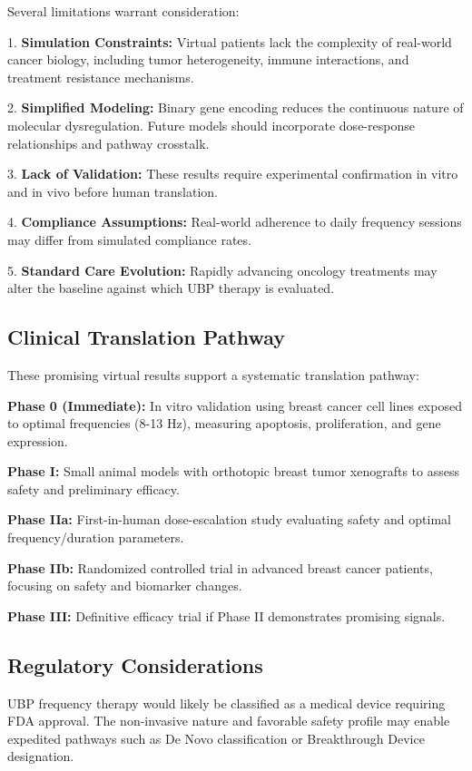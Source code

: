\documentclass[12pt,a4paper]{article}
\begin{document}
Several limitations warrant consideration:

1. \textbf{Simulation Constraints:} Virtual patients lack the complexity of real-world cancer biology, including tumor heterogeneity, immune interactions, and treatment resistance mechanisms.

2. \textbf{Simplified Modeling:} Binary gene encoding reduces the continuous nature of molecular dysregulation. Future models should incorporate dose-response relationships and pathway crosstalk.

3. \textbf{Lack of Validation:} These results require experimental confirmation in vitro and in vivo before human translation.

4. \textbf{Compliance Assumptions:} Real-world adherence to daily frequency sessions may differ from simulated compliance rates.

5. \textbf{Standard Care Evolution:} Rapidly advancing oncology treatments may alter the baseline against which UBP therapy is evaluated.

\subsection{Clinical Translation Pathway}

These promising virtual results support a systematic translation pathway:

\textbf{Phase 0 (Immediate):} In vitro validation using breast cancer cell lines exposed to optimal frequencies (8-13 Hz), measuring apoptosis, proliferation, and gene expression.

\textbf{Phase I:} Small animal models with orthotopic breast tumor xenografts to assess safety and preliminary efficacy.

\textbf{Phase IIa:} First-in-human dose-escalation study evaluating safety and optimal frequency/duration parameters.

\textbf{Phase IIb:} Randomized controlled trial in advanced breast cancer patients, focusing on safety and biomarker changes.

\textbf{Phase III:} Definitive efficacy trial if Phase II demonstrates promising signals.

\subsection{Regulatory Considerations}

UBP frequency therapy would likely be classified as a medical device requiring FDA approval. The non-invasive nature and favorable safety profile may enable expedited pathways such as De Novo classification or Breakthrough Device designation.
\end{document}
